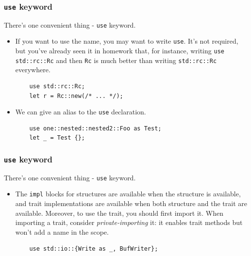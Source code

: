\documentclass[aspectratio=1610,t]{beamer}
\begin{document}

\begin{frame}[fragile]
\frametitle{\texttt{use} keyword}
There's one convenient thing - \texttt{use} keyword.

\begin{itemize}
    \item<1-> If you want to use the name, you may want to write \texttt{use}. It's not required, but you've already seen it in homework that, for instance, writing \texttt{use std::rc::Rc} and then \texttt{Rc} is much better than writing \texttt{std::rc::Rc} everywhere.

    \begin{verbatim}
    use std::rc::Rc;
    let r = Rc::new(/* ... */);
    \end{verbatim}

    \item<2-> We can give an alias to the \texttt{use} declaration.

    \begin{verbatim}
    use one::nested::nested2::Foo as Test;
    let _ = Test {};
    \end{verbatim}
\end{itemize}
\end{frame}


\begin{frame}[fragile]
\frametitle{\texttt{use} keyword}
There's one convenient thing - \texttt{use} keyword.

\begin{itemize}
    \item<1-> The \texttt{impl} blocks for structures are available when the structure is available, and trait implementations are available when both structure and the trait are available. Moreover, to use the trait, you should first import it. When importing a trait, consider \textit{private-importing} it: it enables trait methods but won't add a name in the scope.

    \begin{verbatim}
    use std::io::{Write as _, BufWriter};
    \end{verbatim}
\end{itemize}
\end{frame}

\end{document}
